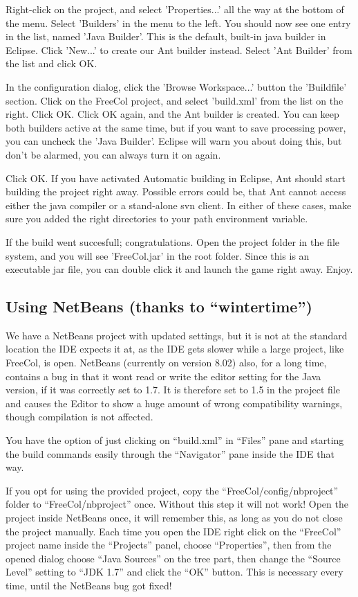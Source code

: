 \documentclass[12pt]{book}
\begin{document}
Right-click on the project, and select 'Properties...' all the way at
the bottom of the menu. Select 'Builders' in the menu to the left. You
should now see one entry in the list, named 'Java Builder'. This is
the default, built-in java builder in Eclipse. Click 'New...' to
create our Ant builder instead. Select 'Ant Builder' from the list and
click OK.

In the configuration dialog, click the 'Browse Workspace...' button
the 'Buildfile' section. Click on the FreeCol project, and select
'build.xml' from the list on the right. Click OK. Click OK again, and
the Ant builder is created. You can keep both builders active at the
same time, but if you want to save processing power, you can uncheck
the 'Java Builder'. Eclipse will warn you about doing this, but don't
be alarmed, you can always turn it on again.

Click OK. If you have activated Automatic building in Eclipse, Ant
should start building the project right away. Possible errors could
be, that Ant cannot access either the java compiler or a stand-alone
svn client. In either of these cases, make sure you added the right
directories to your path environment variable.

If the build went succesfull; congratulations. Open the project folder
in the file system, and you will see 'FreeCol.jar' in the root
folder. Since this is an executable jar file, you can double click it
and launch the game right away. Enjoy.


\hypertarget{Using NetBeans}{\subsection{Using NetBeans (thanks to ``wintertime'')}}

We have a NetBeans project with updated settings, but it is not at the
standard location the IDE expects it at, as the IDE gets slower while a
large project, like FreeCol, is open.
NetBeans (currently on version 8.02) also, for a long time, contains a bug
in that it wont read or write the editor setting for the Java version, if it
was correctly set to 1.7.
It is therefore set to 1.5 in the project file and causes the Editor to show a
huge amount of wrong compatibility warnings, though compilation is not affected.

You have the option of just clicking on ``build.xml'' in ``Files'' pane and
starting the build commands easily through the ``Navigator'' pane inside
the IDE that way.

If you opt for using the provided project, copy the ``FreeCol/config/nbproject''
folder to ``FreeCol/nbproject'' once. Without this step it will not work!
Open the project inside NetBeans once, it will remember this, as long as
you do not close the project manually.
Each time you open the IDE right click on the ``FreeCol'' project name inside
the ``Projects'' panel, choose ``Properties'', then from the opened dialog choose
``Java Sources'' on the tree part, then change the ``Source Level'' setting to
``JDK 1.7'' and click the ``OK'' button. This is necessary every time, until
the NetBeans bug got fixed!
\end{document}
